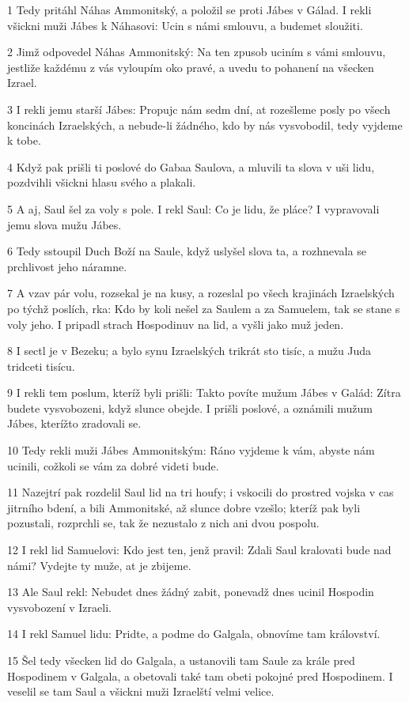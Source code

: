 \par 1 Tedy pritáhl Náhas Ammonitský, a položil se proti Jábes v Gálad. I rekli všickni muži Jábes k Náhasovi: Ucin s námi smlouvu, a budemet sloužiti.
\par 2 Jimž odpovedel Náhas Ammonitský: Na ten zpusob uciním s vámi smlouvu, jestliže každému z vás vyloupím oko pravé, a uvedu to pohanení na všecken Izrael.
\par 3 I rekli jemu starší Jábes: Propujc nám sedm dní, at rozešleme posly po všech koncinách Izraelských, a nebude-li žádného, kdo by nás vysvobodil, tedy vyjdeme k tobe.
\par 4 Když pak prišli ti poslové do Gabaa Saulova, a mluvili ta slova v uši lidu, pozdvihli všickni hlasu svého a plakali.
\par 5 A aj, Saul šel za voly s pole. I rekl Saul: Co je lidu, že pláce? I vypravovali jemu slova mužu Jábes.
\par 6 Tedy sstoupil Duch Boží na Saule, když uslyšel slova ta, a rozhnevala se prchlivost jeho náramne.
\par 7 A vzav pár volu, rozsekal je na kusy, a rozeslal po všech krajinách Izraelských po týchž poslích, rka: Kdo by koli nešel za Saulem a za Samuelem, tak se stane s voly jeho. I pripadl strach Hospodinuv na lid, a vyšli jako muž jeden.
\par 8 I sectl je v Bezeku; a bylo synu Izraelských trikrát sto tisíc, a mužu Juda tridceti tisícu.
\par 9 I rekli tem poslum, kteríž byli prišli: Takto povíte mužum Jábes v Galád: Zítra budete vysvobozeni, když slunce obejde. I prišli poslové, a oznámili mužum Jábes, kterížto zradovali se.
\par 10 Tedy rekli muži Jábes Ammonitským: Ráno vyjdeme k vám, abyste nám ucinili, cožkoli se vám za dobré videti bude.
\par 11 Nazejtrí pak rozdelil Saul lid na tri houfy; i vskocili do prostred vojska v cas jitrního bdení, a bili Ammonitské, až slunce dobre vzešlo; kteríž pak byli pozustali, rozprchli se, tak že nezustalo z nich ani dvou pospolu.
\par 12 I rekl lid Samuelovi: Kdo jest ten, jenž pravil: Zdali Saul kralovati bude nad námi? Vydejte ty muže, at je zbijeme.
\par 13 Ale Saul rekl: Nebudet dnes žádný zabit, ponevadž dnes ucinil Hospodin vysvobození v Izraeli.
\par 14 I rekl Samuel lidu: Pridte, a podme do Galgala, obnovíme tam království.
\par 15 Šel tedy všecken lid do Galgala, a ustanovili tam Saule za krále pred Hospodinem v Galgala, a obetovali také tam obeti pokojné pred Hospodinem. I veselil se tam Saul a všickni muži Izraelští velmi velice.

